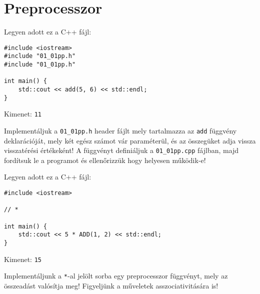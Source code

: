 \documentclass[../exercise_book/exercise_book.tex]{subfiles}
\begin{document}
	\section{Preprocesszor}
	\begin{exercise}
		Legyen adott ez a C++ fájl:
		
		\smallskip
		\begin{lstlisting}
#include <iostream>
#include "01_01pp.h"
#include "01_01pp.h"

int main() {
	std::cout << add(5, 6) << std::endl;
}
		\end{lstlisting}
		Kimenet: \texttt{11}
		
		\smallskip
		Implementáljuk a \texttt{01\_01pp.h} header fájlt mely tartalmazza az \texttt{add} függvény deklarációját, mely két egész számot vár paraméterül, és az összegüket adja vissza visszatérési értékeként! A függvényt definiáljuk a \texttt{01\_01pp.cpp} fájlban, majd fordítsuk le a programot és ellenőrizzük hogy helyesen működik-e!
	\end{exercise}
	\begin{exercise}
		Legyen adott ez a C++ fájl:
		
		\smallskip
		\fbox{\textbf{01\_02pp\_main.cpp}}
		\begin{lstlisting}
#include <iostream>

// *

int main() {
	std::cout << 5 * ADD(1, 2) << std::endl;
}
		\end{lstlisting}
		Kimenet: \texttt{15}
		
		\smallskip
		Implementáljunk a \texttt{*}-al jelölt sorba egy preprocesszor függvényt, mely az összeadást valósítja meg! Figyeljünk a műveletek asszociativitására is!
	\end{exercise}
\end{document}
